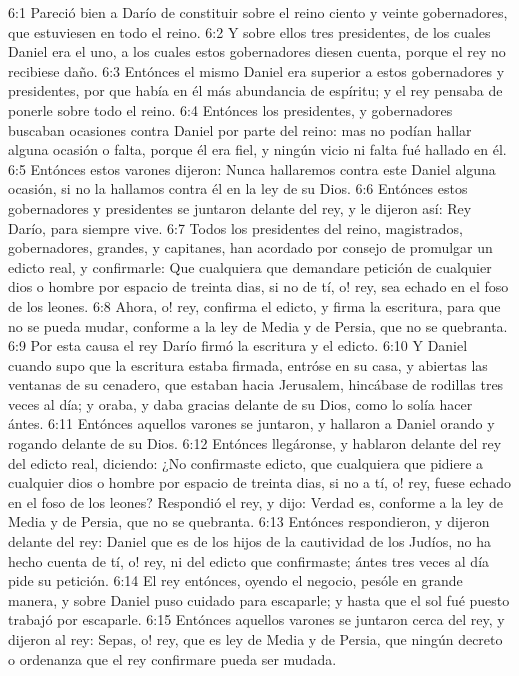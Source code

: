 6:1 Pareció bien a Darío de constituir sobre el reino ciento y veinte gobernadores, que estuviesen en todo el reino.
6:2 Y sobre ellos tres presidentes, de los cuales Daniel era el uno, a los cuales estos gobernadores diesen cuenta, porque el rey no recibiese daño.
6:3 Entónces el mismo Daniel era superior a estos gobernadores y presidentes, por que había en él más abundancia de espíritu; y el rey pensaba de ponerle sobre todo el reino.
6:4 Entónces los presidentes, y gobernadores buscaban ocasiones contra Daniel por parte del reino: mas no podían hallar alguna ocasión o falta, porque él era fiel, y ningún vicio ni falta fué hallado en él.
6:5 Entónces estos varones dijeron: Nunca hallaremos contra este Daniel alguna ocasión, si no la hallamos contra él en la ley de su Dios.
6:6 Entónces estos gobernadores y presidentes se juntaron delante del rey, y le dijeron así: Rey Darío, para siempre vive.
6:7 Todos los presidentes del reino, magistrados, gobernadores, grandes, y capitanes, han acordado por consejo de promulgar un edicto real, y confirmarle: Que cualquiera que demandare petición de cualquier dios o hombre por espacio de treinta dias, si no de tí, o! rey, sea echado en el foso de los leones.
6:8 Ahora, o! rey, confirma el edicto, y firma la escritura, para que no se pueda mudar, conforme a la ley de Media y de Persia, que no se quebranta.
6:9 Por esta causa el rey Darío firmó la escritura y el edicto.
6:10 Y Daniel cuando supo que la escritura estaba firmada, entróse en su casa, y abiertas las ventanas de su cenadero, que estaban hacia Jerusalem, hincábase de rodillas tres veces al día; y oraba, y daba gracias delante de su Dios, como lo solía hacer ántes.
6:11 Entónces aquellos varones se juntaron, y hallaron a Daniel orando y rogando delante de su Dios.
6:12 Entónces llegáronse, y hablaron delante del rey del edicto real, diciendo: ¿No confirmaste edicto, que cualquiera que pidiere a cualquier dios o hombre por espacio de treinta dias, si no a tí, o! rey, fuese echado en el foso de los leones? Respondió el rey, y dijo: Verdad es, conforme a la ley de Media y de Persia, que no se quebranta.
6:13 Entónces respondieron, y dijeron delante del rey: Daniel que es de los hijos de la cautividad de los Judíos, no ha hecho cuenta de tí, o! rey, ni del edicto que confirmaste; ántes tres veces al día pide su petición.
6:14 El rey entónces, oyendo el negocio, pesóle en grande manera, y sobre Daniel puso cuidado para escaparle; y hasta que el sol fué puesto trabajó por escaparle.
6:15 Entónces aquellos varones se juntaron cerca del rey, y dijeron al rey: Sepas, o! rey, que es ley de Media y de Persia, que ningún decreto o ordenanza que el rey confirmare pueda ser mudada.
